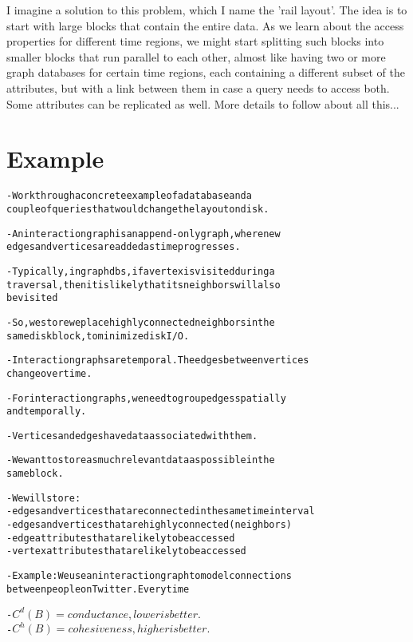 \documentclass{sig-alternate}
\begin{document}
I imagine a solution to this problem, which I name the 'rail layout'. The idea
is to start with large blocks that contain the entire data. As we learn about
the access properties for different time regions, we might start splitting
such blocks into smaller blocks that run parallel to each other, almost like
having two or more graph databases for certain time regions, each containing a
 different subset of the attributes, but with a link between them in case a
query needs to access both. Some attributes can be replicated as well. 
More details to follow about all this...

\section{Example}

\begin{alltt}\scriptsize
- Work through a concrete example of a database and a 
   couple of queries that would change the layout on disk.

- An interaction graph is an append-only graph, where new 
   edges and vertices are added as time progresses. 

- Typically, in graph dbs, if a vertex is visited during a 
   traversal, then it is likely that its neighbors will also 
    be visited

- So, we store we place highly connected neighbors in the 
    same disk block, to minimize disk I/O.

- Interaction graphs are temporal. The edges between vertices 
   change over time. 

- For interaction graphs, we need to group edges spatially 
   and temporally.

- Vertices and edges have data associated with them. 

- We want to store as much relevant data as possible in the 
   same block.

- We will store:
   - edges and vertices that are connected in the same time interval
   - edges and vertices that are highly connected (neighbors)
   - edge attributes that are likely to be accessed
   - vertex attributes that are likely to be accessed

- Example: We use an interaction graph to model connections
   between people on Twitter. Every time 

- $C^d(B) = conductance, lower is better.$
- $C^h(B) = cohesiveness, higher is better.$

\end{alltt}
\end{document}
